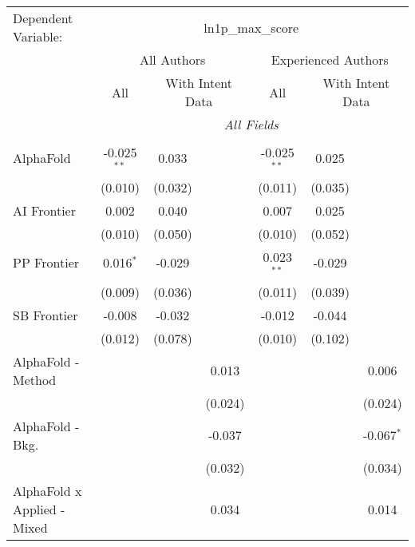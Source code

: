 \begingroup
\centering
\begin{tabular}{lcccccc}
   \tabularnewline \midrule \midrule
   Dependent Variable: & \multicolumn{6}{c}{ln1p\_max\_score}\\
 & \multicolumn{3}{c}{All Authors} & \multicolumn{3}{c}{Experienced Authors} \\
\cmidrule(lr){2-4} \cmidrule(lr){5-7}
 & \multicolumn{1}{c}{All} & \multicolumn{2}{c}{With Intent Data} & \multicolumn{1}{c}{All} & \multicolumn{2}{c}{With Intent Data} \\
\cmidrule(lr){2-2} \cmidrule(lr){3-4} \cmidrule(lr){5-5} \cmidrule(lr){6-7}
 & \multicolumn{6}{c}{\textit{All Fields}} \\ \\
   AlphaFold                     & -0.025$^{**}$ & 0.033   &         & -0.025$^{**}$ & 0.025   &   \\   
                                 & (0.010)       & (0.032) &         & (0.011)       & (0.035) &   \\   
   AI Frontier                   & 0.002         & 0.040   &         & 0.007         & 0.025   &   \\   
                                 & (0.010)       & (0.050) &         & (0.010)       & (0.052) &   \\   
   PP Frontier                   & 0.016$^{*}$   & -0.029  &         & 0.023$^{**}$  & -0.029  &   \\   
                                 & (0.009)       & (0.036) &         & (0.011)       & (0.039) &   \\   
   SB Frontier                   & -0.008        & -0.032  &         & -0.012        & -0.044  &   \\   
                                 & (0.012)       & (0.078) &         & (0.010)       & (0.102) &   \\   
   AlphaFold - Method            &               &         & 0.013   &               &         & 0.006\\   
                                 &               &         & (0.024) &               &         & (0.024)\\   
   AlphaFold - Bkg.              &               &         & -0.037  &               &         & -0.067$^{*}$\\   
                                 &               &         & (0.032) &               &         & (0.034)\\   
   AlphaFold x Applied - Mixed   &               &         & 0.034   &               &         & 0.014\\   

\end{tabular}
